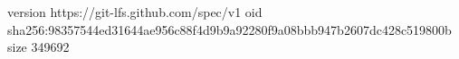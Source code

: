 version https://git-lfs.github.com/spec/v1
oid sha256:98357544ed31644ae956c88f4d9b9a92280f9a08bbb947b2607dc428c519800b
size 349692
